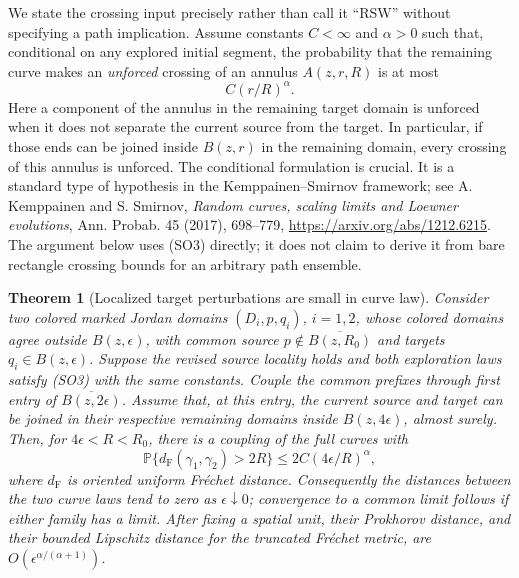 \documentclass[11pt]{article}
\newtheorem{theorem}{Theorem}[section]
\theoremstyle{definition}\newtheorem{definition}[theorem]{Definition}
\theoremstyle{remark}\newtheorem{remark}[theorem]{Remark}
\begin{document}
We state the crossing input precisely rather than call it ``RSW'' without
specifying a path implication.  Assume constants $C<\infty$ and $\alpha>0$
such that, conditional on any explored initial segment, the probability
that the remaining curve makes an \emph{unforced} crossing of an annulus
$A(z,r,R)$ is at most
\[
 C(r/R)^\alpha.
 \tag{SO3}
\]
Here a component of the annulus in the remaining target domain is unforced
when it does not separate the current source from the target.  In particular,
if those ends can be joined inside $B(z,r)$ in the remaining domain, every
crossing of this annulus is unforced.  The conditional formulation is crucial.
It is a standard type of hypothesis in the Kemppainen--Smirnov framework;
see A. Kemppainen and S. Smirnov, \emph{Random curves, scaling limits and
Loewner evolutions}, Ann. Probab. 45 (2017), 698--779,
\url{https://arxiv.org/abs/1212.6215}.  The argument below uses (SO3) directly;
it does not claim to derive it from bare rectangle crossing bounds for an
arbitrary path ensemble.

\begin{theorem}[Localized target perturbations are small in curve law]
Consider two colored marked Jordan domains $(D_i,p,q_i)$, $i=1,2$,
whose colored domains agree outside $B(z,\epsilon)$, with common source
$p\notin\overline{B(z,R_0)}$ and targets $q_i\in B(z,\epsilon)$.
Suppose the revised source locality holds and both exploration laws satisfy
(SO3) with the same constants.  Couple the common prefixes through first
entry of $\overline{B(z,2\epsilon)}$.  Assume that, at this entry, the current
source and target can be joined in their respective remaining domains
inside $B(z,4\epsilon)$, almost surely.  Then, for
$4\epsilon<R<R_0$, there is a coupling of the full curves with
\[
 \mathbb P\{d_{\mathrm F}(\gamma_1,\gamma_2)>2R\}
       \leq 2C(4\epsilon/R)^\alpha,
 \tag{SO4}
\]
where $d_{\mathrm F}$ is oriented uniform Fr\'echet distance.
Consequently the distances between the two curve laws tend to zero as $\epsilon\downarrow0$; convergence to a common limit follows if either family has a limit.
After fixing a spatial unit, their Prokhorov distance, and their bounded
Lipschitz distance for the truncated Fr\'echet metric, are
$O(\epsilon^{\alpha/(\alpha+1)})$.
\end{theorem}
\end{document}
